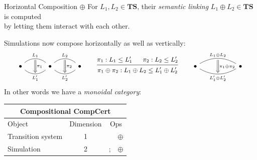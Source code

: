 \documentclass[aspectratio=1610,12pt]{beamer}
\begin{document}
\begin{frame}[fragile]{Horizontal Composition $\oplus$} %
  For $L_1, L_2 \in \mathbf{TS}$,
  their \emph{semantic linking} $L_1 \oplus L_2 \in \mathbf{TS}$
  is computed \\ by letting them interact with each other.

  \pause
  Simulations now compose horizontally as well as vertically:
\[
  \small
  \begin{tikzcd}[row sep=tiny, column sep=small]
    & {} \ar[dd, Rightarrow, "\pi_1"] & & {} \ar[dd, Rightarrow, "\pi_2"] \\
    \bullet \ar[rr, bend left=40, "L_1", dash]
            \ar[rr, bend right=40, "L_1'"', dash] & &
    \bullet \ar[rr, bend left=40, "L_2", dash]
            \ar[rr, bend right=40, "L_2'"', dash] & &
    \bullet \\
    & {} & & {}
  \end{tikzcd}
  \qquad
  \begin{prooftree}
     \hypo{\pi_1 : L_1 \le L_1'}
     \hypo{\pi_2 : L_2 \le L_2'}
     \infer2{\pi_1 \oplus \pi_2 : L_1 \oplus L_2 \le L_1' \oplus L_2'}
  \end{prooftree}
  \qquad
  \begin{tikzcd}[row sep=tiny]
    & {} \ar[dd, Rightarrow, "\pi_1 \oplus \pi_2"] & \\
    \bullet
      \ar[rr, bend left, "L_1 \oplus L_2", dash]
      \ar[rr, bend right, "L_1' \oplus L_2'"', dash] & &
    \bullet
    \\
    & {} &
  \end{tikzcd}
\]
  \pause
  In other words we have a \emph{monoidal category}:
  \begin{center}
    \begin{tabular}{lccc}
      \toprule
      \multicolumn{4}{c}{\textbf{Compositional CompCert}} \\
      \midrule
      Object & Dimension & \multicolumn{2}{c}{Ops} \\
      \midrule
      Transition system & 1 & & $\oplus$ \\
      Simulation & 2 & $\mathbin;$ & $\oplus$ \\
      \bottomrule
    \end{tabular}
  \end{center}
\end{frame}
\end{document}
